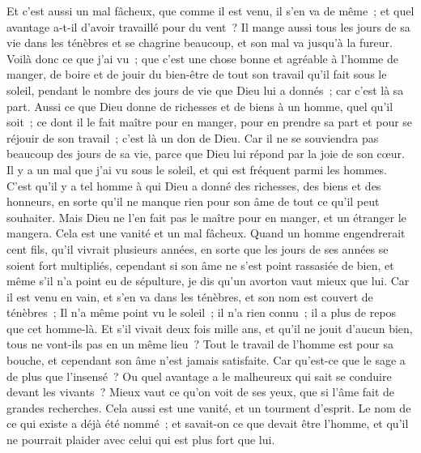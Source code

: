 \begin{multicols}{2}
Et c'est aussi un mal fâcheux, que comme il est venu, il s'en va de même~; et quel avantage a-t-il d'avoir travaillé pour du vent~?
Il mange aussi tous les jours de sa vie dans les ténèbres et se chagrine beaucoup, et son mal va jusqu'à la fureur.
Voilà donc ce que j'ai vu~; que c'est une chose bonne et agréable à l'homme de manger, de boire et de jouir du bien-être de tout son travail qu'il fait sous le soleil, pendant le nombre des jours de vie que Dieu lui a donnés~; car c'est là sa part.
Aussi ce que Dieu donne de richesses et de biens à un homme, quel qu'il soit~; ce dont il le fait maître pour en manger, pour en prendre sa part et pour se réjouir de son travail~; c'est là un don de Dieu. 
Car il ne se souviendra pas beaucoup des jours de sa vie, parce que Dieu lui répond par la joie de son cœur. 
\VerseOne{}Il y a un mal que j'ai vu sous le soleil, et qui est fréquent parmi les hommes.
C'est qu'il y a tel homme à qui Dieu a donné des richesses, des biens et des honneurs, en sorte qu'il ne manque rien pour son âme de tout ce qu'il peut souhaiter. Mais Dieu ne l'en fait pas le maître pour en manger, et un étranger le mangera. Cela est une vanité et un mal fâcheux. 
Quand un homme engendrerait cent fils, qu'il vivrait plusieurs années, en sorte que les jours de ses années se soient fort multipliés, cependant si son âme ne s'est point rassasiée de bien, et même s'il n'a point eu de sépulture, je dis qu'un avorton vaut mieux que lui.
Car il est venu en vain, et s'en va dans les ténèbres, et son nom est couvert de ténèbres~;
Il n'a même point vu le soleil~; il n'a rien connu~; il a plus de repos que cet homme-là.
Et s'il vivait deux fois mille ans, et qu'il ne jouit d'aucun bien, tous ne vont-ils pas en un même lieu~?
Tout le travail de l'homme est pour sa bouche, et cependant son âme n'est jamais satisfaite.
Car qu'est-ce que le sage a de plus que l'insensé~? Ou quel avantage a le malheureux qui sait se conduire devant les vivants~?
Mieux vaut ce qu'on voit de ses yeux, que si l'âme fait de grandes recherches. Cela aussi est une vanité, et un tourment d'esprit.
Le nom de ce qui existe a déjà été nommé~; et savait-on ce que devait être l'homme, et qu'il ne pourrait plaider avec celui qui est plus fort que lui. 

\end{multicols}

